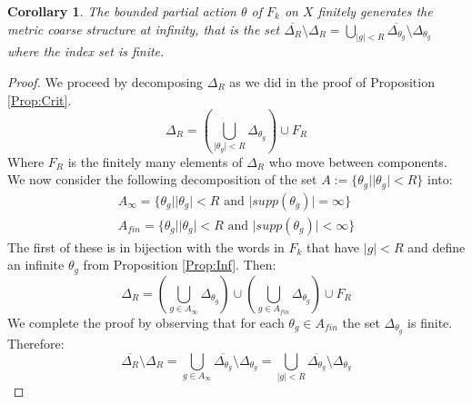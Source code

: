 \documentclass[11pt]{amsart}
\theoremstyle{plain}
\newtheorem{corollary}[theorem]{Corollary}%
\theoremstyle{definition}%
\theoremstyle{remark}%
\begin{document}
\begin{corollary}
The bounded partial action $\theta$ of $F_{k}$ on $X$ finitely generates the metric coarse structure at infinity, that is the set $\overline{\Delta_{R}}\setminus \Delta_{R} = \bigcup_{\vert g \vert < R}\overline{\Delta_{\theta_{g}}}\setminus \Delta_{\theta_{g}}$ where the index set is finite.
\end{corollary}
\begin{proof}
We proceed by decomposing $\Delta_{R}$ as we did in the proof of Proposition \ref{Prop:Crit}.
\begin{equation*}
\Delta_{R}=(\bigcup_{\vert \theta_{g} \vert < R}\Delta_{\theta_{g}})\cup F_{R}
\end{equation*}
Where $F_{R}$ is the finitely many elements of $\Delta_{R}$ who move between components. We now consider the following decomposition of the set $A:=\lbrace \theta_{g} | \vert \theta_{g}\vert < R\rbrace$ into:
\begin{eqnarray*}
A_{\infty}=\lbrace \theta_{g} | \vert \theta_{g} \vert < R \mbox{ and } \vert supp(\theta_{g})\vert = \infty \rbrace \\
A_{fin}=\lbrace \theta_{g} | \vert \theta_{g} \vert < R\mbox{ and } \vert supp(\theta_{g})\vert < \infty \rbrace
\end{eqnarray*}
The first of these is in bijection with the words in $F_{k}$ that have $\vert g \vert < R$ and define an infinite $\theta_{g}$ from Proposition \ref{Prop:Inf}. Then:
\begin{equation*}
\Delta_{R}=(\bigcup_{g \in A_{\infty}}\Delta_{\theta_{g}})\cup (\bigcup_{g \in A_{fin}}\Delta_{\theta_{g}}) \cup F_{R}
\end{equation*}
We complete the proof by observing that for each $\theta_{g} \in A_{fin}$ the set $\Delta_{\theta_{g}}$ is finite. Therefore:
\begin{equation*}
\overline{\Delta_{R}}\setminus \Delta_{R} = \bigcup_{g \in A_{\infty}}\overline{\Delta_{\theta_{g}}}\setminus \Delta_{\theta_{g}}= \bigcup_{\vert g \vert < R}\overline{\Delta_{\theta_{g}}}\setminus \Delta_{\theta_{g}}
\end{equation*}\end{proof}
\end{document}
